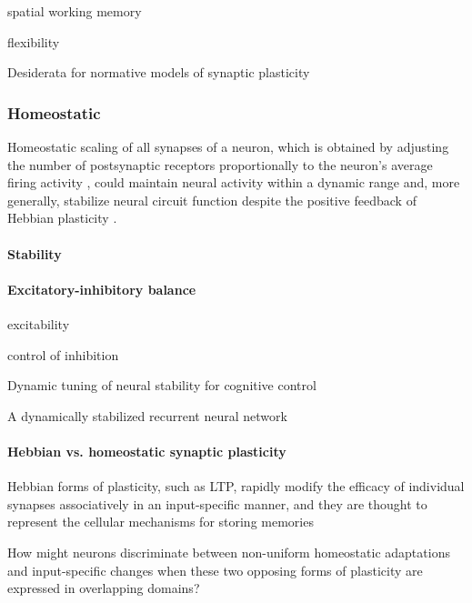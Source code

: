 \documentclass{article}
\theoremstyle{definition} \newtheorem{definition}{Definition}
\theoremstyle{remark} \newtheorem{remark}{Remark}
\newcounter{ct}
\begin{document}
spatial working memory\citep{compte2000synaptic}

flexibility \citep{remington2018flexible}

Desiderata for normative models of synaptic plasticity \citep{bredenberg2024desiderata}

\subsubsection{Homeostatic} \citep{turrigiano2004homeostatic}

Homeostatic scaling of all synapses of a neuron, which is obtained by adjusting the number of postsynaptic receptors proportionally to the neuron’s average firing activity \citep{turrigiano1998activity,turrigiano1999homeostatic},
 could maintain neural activity within a dynamic range and, more generally, stabilize neural circuit function despite the positive feedback of Hebbian plasticity \citep{toyoizumi2014modeling}. 
 
 \citep{niemeyer2021homeostasis}
 \citep{oleary2018homeostasis}
 
 \paragraph{Stability}
 \citep{aljaberi2021global}
 
 \paragraph{Excitatory-inhibitory balance}
 
 excitability \citep{daoudal2003long}
 
 control of inhibition \citep{machens2005flexible}

 Dynamic tuning of neural stability for cognitive control \citep{xu2024dynamic}
 
 A dynamically stabilized recurrent neural network \citep{saab2022stabilized}
 
\paragraph{Hebbian vs. homeostatic synaptic plasticity}
\citep{pozo2010unraveling}
Hebbian forms of plasticity, such as LTP, rapidly modify the efficacy of individual synapses associatively in an input-specific manner, and they are thought to represent the cellular mechanisms for storing memories

How might neurons discriminate between non-uniform homeostatic adaptations and input-specific changes when these two opposing forms of plasticity are expressed in overlapping domains? \citep{rabinowitch2006interplay, rabinowitch2008two}
 
\end{document}

